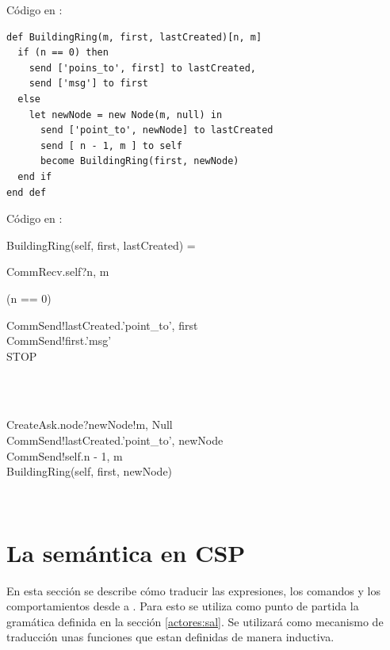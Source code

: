 Código en \SAL:

\begin{lstlisting}[language=sal, style=simple]
def BuildingRing(m, first, lastCreated)[n, m]
  if (n == 0) then
    send ['poins_to', first] to lastCreated,
    send ['msg'] to first
  else
    let newNode = new Node(m, null) in
      send ['point_to', newNode] to lastCreated
      send [ n - 1, m ] to self
      become BuildingRing(first, newNode)
  end if
end def
\end{lstlisting}

Código en \CSP:

\begin{process}
BuildingRing(self, first, lastCreated) = \\ \quad
  \begin{block}
  CommRecv.self?\langle n, m \rangle \then \\ \quad
  \begin{block} 
  \If (n == 0) \Then {} \\ \quad
    \begin{block}
    CommSend!lastCreated.\langle 'point\_to', first \rangle \then \\
    CommSend!first.\langle 'msg' \rangle \then \\
    STOP
    \end{block} \\
  \Else {} \\ \quad
    \begin{block} 
    CreateAsk.node?newNode!\langle m, Null \rangle \then \\
    CommSend!lastCreated.\langle 'point\_to', newNode \rangle \then \\
    CommSend!self.\langle n - 1, m \rangle \then \\
    BuildingRing(self, first, newNode) 
    \end{block} \\
  \end{block} 
\end{block}
\end{process}

\section{La semántica en CSP}

En esta sección se describe cómo traducir las expresiones, los comandos y los comportamientos desde \SAL a \CSP. Para esto se utiliza como punto de partida la gramática definida en la sección \ref{actores:sal}. Se utilizará como mecanismo de traducción unas funciones que estan definidas de manera inductiva.

